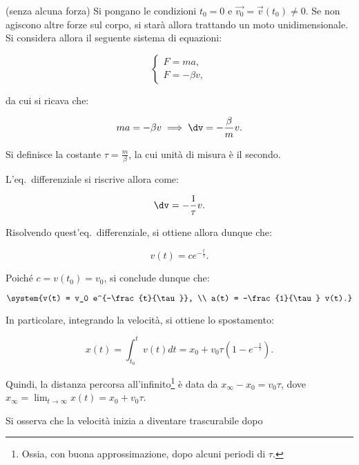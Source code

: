 \documentclass[11pt]{article}
\begin{document}
	\begin{example} (senza alcuna forza)
		Si pongano le condizioni $t_0 = 0$ e $\Vec{v_0} = \Vec{v}(t_0) \neq 0$. Se non agiscono altre forze sul corpo, si starà
		allora trattando un moto unidimensionale. Si considera
		allora il seguente sistema di equazioni:
		
		\[ \begin{cases} F = ma, \\ F = -\beta v, \end{cases} \]
		
		da cui si ricava che:
		
		\[ ma=-\beta v \implies \dv=-\frac{\beta}{m} v. \]
		
		Si definisce la costante $\tau = \frac{m}{\beta}$,
		la cui unità di misura è il secondo.
		
		L'eq.~differenziale si riscrive allora come:
		
		\[ \dv = -\frac{1}{\tau} v. \]
		
		Risolvendo quest'eq.~differenziale, si ottiene allora
		dunque che:
		
		\[ v(t) = c e^{-\frac{t}{\tau}}. \]
		
		Poiché $c = v(t_0) = v_0$, si conclude dunque che:
		
		\[ \system{v(t) = v_0 e^{-\frac{t}{\tau}}, \\ a(t) = -\frac{1}{\tau} v(t).} \]
		
		\vskip 0.1in
		
		In particolare, integrando la velocità, si ottiene lo
		spostamento:
		
		\[ x(t) = \int_{t_0}^t v(t) dt = x_0 + v_0 \tau (1- e^{-\frac{t}{\tau}}). \]
		
		Quindi, la distanza percorsa all'infinito\footnote{Ossia, con
			buona approssimazione, dopo alcuni periodi di $\tau$.} è
		data da $x_\infty - x_0 = v_0 \tau$, dove $x_\infty = \lim_{t \to \infty} x(t) = x_0 + v_0 \tau$.
		
	\end{example}
	
	\begin{remark}
		Si osserva che la velocità inizia a diventare
		trascurabile dopo
	\end{remark}
	
\end{document}
